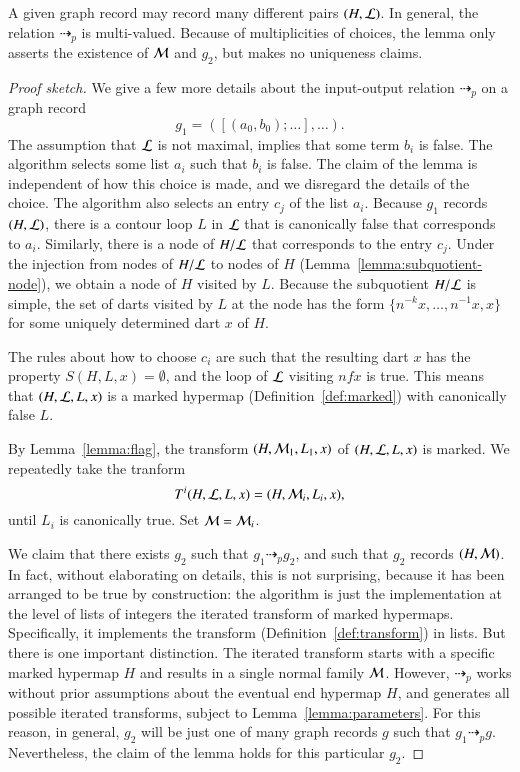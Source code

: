 \begin{remark}
  A given graph record may record many different pairs $(H,{\cal L})$.
  In general, the relation $\dashrightarrow_p$ is multi-valued.
  Because of multiplicities of choices, the lemma only asserts the
  existence of ${\cal M}$ and $g_2$, but makes no uniqueness claims.
\end{remark}

\begin{proof}[Proof sketch]
We give a few more details about the input-output relation
$\dashrightarrow_p$ on a graph record 
\[
g_1 = ([(a_0,b_0);\ldots],\ldots).
\]
The assumption that ${\cal L}$ is not maximal, implies that some term
$b_i$ is false.  The algorithm selects some list $a_i$ such that $b_i$
is false.  The claim of the lemma is independent of how this choice is
made, and we disregard the details of the choice.  The algorithm also
selects an entry $c_j$ of the list $a_i$.  Because $g_1$ records
$(H,{\cal L})$, there is a contour loop $L$ in ${\cal L}$ that is
canonically false that corresponds to $a_i$.  Similarly, there is a
node of $H/{\cal L}$ that corresponds to the entry $c_j$.  Under the
injection from nodes of $H/{\cal L}$ to nodes of $H$
(Lemma~\ref{lemma:subquotient-node}), we obtain a node of $H$ visited
by $L$.  Because the subquotient $H/{\cal L}$ is simple, the set of
darts visited by $L$ at the node has the form $\{n^{-k}
x,\ldots,n^{-1}x,x\}$ for some uniquely determined dart $x$ of $H$.

The rules about how to choose $c_i$ are such that the resulting dart
$x$ has the property $S(H,L,x)=\emptyset$, and the loop of ${\cal L}$
visiting $n f x$ is true.  This means that $(H,{\cal L},L,x)$ is a
marked hypermap (Definition~\ref{def:marked}) with canonically false
$L$.

By Lemma~\ref{lemma:flag}, the transform $(H,{\cal M}_1,L_1,x)$ of
$(H,{\cal L},L,x)$ is marked.  We repeatedly take the
tranform
\[
T^i(H,{\cal L},L,x) = (H,{\cal M}_i,L_i,x),
\]
until $L_i$ is canonically true.  Set ${\cal M}={\cal M}_i$.

We claim that there exists $g_2$ such that $g_1 \dashrightarrow_p
g_2$, and such that $g_2$ records $(H,{\cal M})$.  In fact, without
elaborating on details, this is not surprising, because it has been
arranged to be true by construction: the algorithm is just the
implementation at the level of lists of integers the iterated
transform of marked hypermaps.  Specifically, it implements the
transform (Definition~\ref{def:transform}) in lists.  But there is one important
distinction.  The iterated transform starts with a specific marked
hypermap $H$ and results in a single normal family ${\cal M}$.
However, $\dashrightarrow_p$ works without prior assumptions about the
eventual end hypermap $H$, and generates all possible iterated
transforms, subject to Lemma~\ref{lemma:parameters}.  
For this reason, in general, $g_2$ will be just one of
many graph records $g$ such that $g_1\dashrightarrow_p g$.  Nevertheless,
the claim of the lemma holds for this particular $g_2$.
\end{proof}


